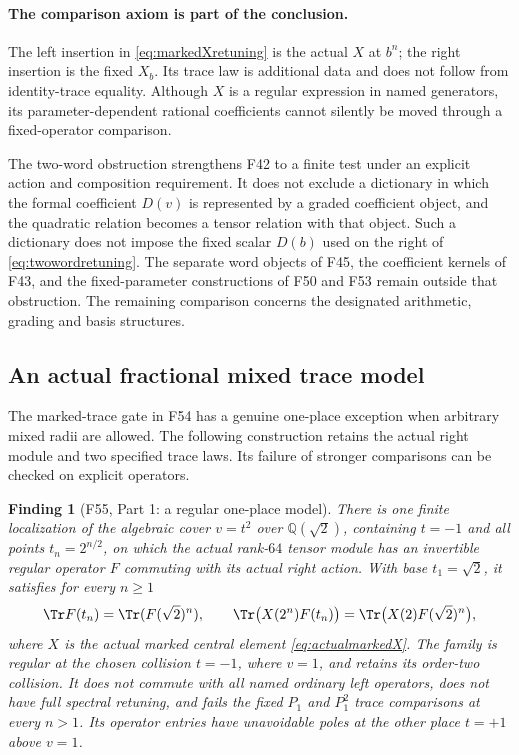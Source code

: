 \documentclass[11pt,a4paper]{article}
\newcommand{\Q}{\mathbb Q}\newcommand{\Z}{\mathbb Z}\newcommand{\C}{\mathbb C}\newcommand{\N}{\mathbb N}\newcommand{\F}{\mathbb F}
\newcommand{\fid}[1]{\textsf{#1}}\newcommand{\gate}[1]{\textsf{#1}}
\theoremstyle{named}\newtheorem{finding}{Finding}[section]
\theoremstyle{definition}\newtheorem{definition}[finding]{Definition}
\theoremstyle{remark}\newtheorem{remark}[finding]{Remark}
\begin{document}
\paragraph{The comparison axiom is part of the conclusion.}
The left insertion in \eqref{eq:markedXretuning} is the
actual $X$ at $b^n$; the right insertion is the fixed
$X_b$.
Its trace law is additional data and does not follow
from identity-trace equality.
Although $X$ is a regular expression in named generators,
its parameter-dependent rational coefficients cannot
silently be moved through a fixed-operator comparison.

The two-word obstruction strengthens \fid{F42} to a
finite test under an explicit action and composition
requirement.
It does not exclude a dictionary in which the formal
coefficient $D(v)$ is represented by a graded coefficient
object, and the quadratic relation becomes a tensor
relation with that object.
Such a dictionary does not impose the fixed scalar
$D(b)$ used on the right of \eqref{eq:twowordretuning}.
The separate word objects of \fid{F45}, the coefficient
kernels of \fid{F43}, and the fixed-parameter constructions
of \fid{F50} and \fid{F53} remain outside that obstruction.
The remaining comparison concerns the designated
arithmetic, grading and basis structures.

\subsection{An actual fractional mixed trace model}
The marked-trace gate in \fid{F54} has a genuine
one-place exception when arbitrary mixed radii are allowed.
The following construction retains the actual right module
and two specified trace laws. Its failure of stronger
comparisons can be checked on explicit operators.

\begin{finding}[\fid{F55}, Part 1: a regular one-place model]
\label{f:fractionalescape}
There is one finite localization of the algebraic cover
$v=t^2$ over $\Q(\sqrt2)$, containing $t=-1$ and all points
$t_n=2^{n/2}$, on which the actual rank-$64$ tensor module
has an invertible regular operator $F$ commuting with its
actual right action. With base $t_1=\sqrt2$, it satisfies
for every $n\ge1$
\begin{equation}\label{eq:fractionaltwotraces}
 \Tr F(t_n)=\Tr(F(\sqrt2)^n),\qquad
 \Tr\bigl(X(2^n)F(t_n)\bigr)
       =\Tr\bigl(X(2)F(\sqrt2)^n\bigr),
\end{equation}
where $X$ is the actual marked central element
\eqref{eq:actualmarkedX}.
The family is regular at the chosen collision $t=-1$,
where $v=1$, and retains its order-two collision.
It does not commute with all named ordinary left
operators, does not have full spectral retuning, and
fails the fixed $P_1$ and $P_1^2$ trace comparisons at
every $n>1$. Its operator entries have unavoidable poles
at the other place $t=+1$ above $v=1$.
\end{finding}
\end{document}
